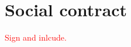 \chapter{Social contract}
\makeatletter{}\makeatother
\label{appen:social_contract}
\textcolor{red}{Sign and inlcude.}
     \begin{figure}[!htb]
     \centering
       \label{fig:social_contract}
	\end{figure}